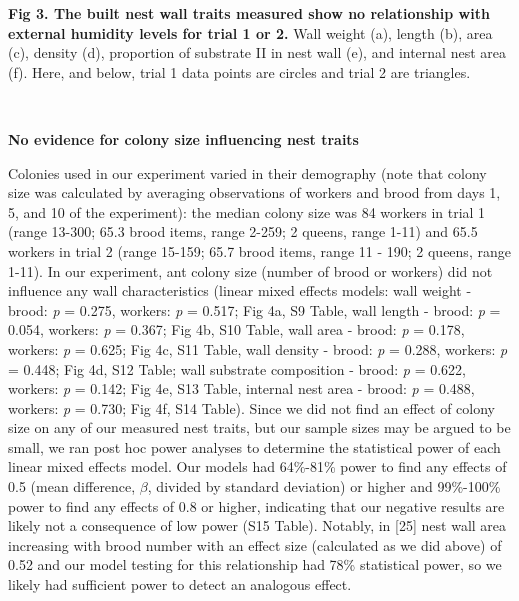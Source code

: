 \documentclass[3p]{elsarticle} %
\begin{document}
\textbf{Fig 3. The built nest wall traits measured show no relationship
with external humidity levels for trial 1 or 2.} Wall weight (a), length
(b), area (c), density (d), proportion of substrate II in nest wall (e),
and internal nest area (f). Here, and below, trial 1 data points are
circles and trial 2 are triangles.

~

\textbf{No evidence for colony size influencing nest traits}

Colonies used in our experiment varied in their demography (note that
colony size was calculated by averaging observations of workers and
brood from days 1, 5, and 10 of the experiment): the median colony size
was 84 workers in trial 1 (range 13-300; 65.3 brood items, range 2-259;
2 queens, range 1-11) and 65.5 workers in trial 2 (range 15-159; 65.7
brood items, range 11 - 190; 2 queens, range 1-11). In our experiment,
ant colony size (number of brood or workers) did not influence any wall
characteristics (linear mixed effects models: wall weight - brood:
\emph{p} = 0.275, workers: \emph{p} = 0.517; Fig 4a, S9 Table, wall
length - brood: \emph{p} = 0.054, workers: \emph{p} = 0.367; Fig 4b, S10
Table, wall area - brood: \emph{p} = 0.178, workers: \emph{p} = 0.625;
Fig 4c, S11 Table, wall density - brood: \emph{p} = 0.288, workers:
\emph{p} = 0.448; Fig 4d, S12 Table; wall substrate composition - brood:
\emph{p} = 0.622, workers: \emph{p} = 0.142; Fig 4e, S13 Table, internal
nest area - brood: \emph{p} = 0.488, workers: \emph{p} = 0.730; Fig 4f,
S14 Table). Since we did not find an effect of colony size on any of our
measured nest traits, but our sample sizes may be argued to be small, we
ran post hoc power analyses to determine the statistical power of each
linear mixed effects model. Our models had 64\%-81\% power to find any
effects of 0.5 (mean difference, \(\beta\), divided by standard
deviation) or higher and 99\%-100\% power to find any effects of 0.8 or
higher, indicating that our negative results are likely not a
consequence of low power (S15 Table). Notably, in {[}25{]} nest wall
area increasing with brood number with an effect size (calculated as we
did above) of 0.52 and our model testing for this relationship had 78\%
statistical power, so we likely had sufficient power to detect an
analogous effect.
\end{document}
